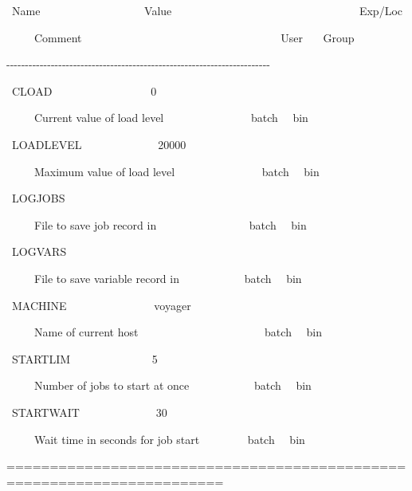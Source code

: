 \begin{exparasmall}

\ Name \ \ \ \ \ \ \ \ \ \ \ \ \ \ \ \ \ \ Value
\ \ \ \ \ \ \ \ \ \ \ \ \ \ \ \ \ \ \ \ \ \ \ \ \ \ \ \ \ \ \ \ \ Exp/Loc

\ \ \ \ \ Comment
\ \ \ \ \ \ \ \ \ \ \ \ \ \ \ \ \ \ \ \ \ \ \ \ \ \ \ \ \ \ \ \ \ \ \ User
\ \ \ Group

{}-{}-{}-{}-{}-{}-{}-{}-{}-{}-{}-{}-{}-{}-{}-{}-{}-{}-{}-{}-{}-{}-{}-{}-{}-{}-{}-{}-{}-{}-{}-{}-{}-{}-{}-{}-{}-{}-{}-{}-{}-{}-{}-{}-{}-{}-{}-{}-{}-{}-{}-{}-{}-{}-{}-{}-{}-{}-{}-{}-{}-{}-{}-{}-{}-{}-{}-{}-{}-{}-{}-

\bigskip


\ CLOAD \ \ \ \ \ \ \ \ \ \ \ \ \ \ \ \ \ 0

\ \ \ \ \ Current value of load level
\ \ \ \ \ \ \ \ \ \ \ \ \ \ \ batch \ \ bin

\bigskip


\ LOADLEVEL \ \ \ \ \ \ \ \ \ \ \ \ \ 20000

\ \ \ \ \ Maximum value of load level
\ \ \ \ \ \ \ \ \ \ \ \ \ \ \ batch \ \ bin

\bigskip


\ LOGJOBS

\ \ \ \ \ File to save job record in
\ \ \ \ \ \ \ \ \ \ \ \ \ \ \ \ batch \ \ bin

\bigskip


\ LOGVARS

\ \ \ \ \ File to save variable record in \ \ \ \ \ \ \ \ \ \ \ batch
\ \ bin

\bigskip


\ MACHINE \ \ \ \ \ \ \ \ \ \ \ \ \ \ \ voyager

\ \ \ \ \ Name of current host
\ \ \ \ \ \ \ \ \ \ \ \ \ \ \ \ \ \ \ \ \ \ batch \ \ bin

\bigskip


\ STARTLIM \ \ \ \ \ \ \ \ \ \ \ \ \ \ 5

\ \ \ \ \ Number of jobs to start at once \ \ \ \ \ \ \ \ \ \ \ batch
\ \ bin

\bigskip


\ STARTWAIT \ \ \ \ \ \ \ \ \ \ \ \ \ 30

\ \ \ \ \ Wait time in seconds for job start \ \ \ \ \ \ \ \ batch
\ \ bin

\bigskip


=======================================================================

\end{exparasmall}

